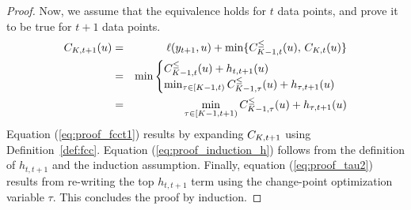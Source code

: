 \documentclass{article}
\begin{document}
\begin{proof}
  Now, we
  assume that the equivalence holds for $t$ data points, and prove it to be true
  for $t+1$ data points.
  \begin{eqnarray}
    C_{K,t+1}(u)\label{eq:proof_fcct1}
    &=&\ell(y_{t+1},u)+\min\{C_{K-1,t}^\leq(u),\,C_{K,t}(u)\}\\
    &=&\min\label{eq:proof_induction_h}
        \begin{cases}
          C_{K-1,t}^\leq(u)+h_{t,t+1}(u)\\
          \min_{\tau\in[K-1,t)} C^\leq_{K-1,\tau}(u)+h_{\tau,t+1}(u)
        \end{cases}\\
    &=&\min_{\tau\in[K-1,t+1)} C^\leq_{K-1,\tau}(u)+h_{\tau,t+1}(u)
        \label{eq:proof_tau2}
  \end{eqnarray}
  Equation (\ref{eq:proof_fcct1}) results by expanding $C_{K,t+1}$
  using Definition~\ref{def:fcc}. Equation
  (\ref{eq:proof_induction_h}) follows from the definition of
  $h_{t,t+1}$ and the induction assumption. Finally, equation
  (\ref{eq:proof_tau2}) results from re-writing the top $h_{t,t+1}$ term using the
  change-point optimization variable $\tau$.  This concludes the proof
  by induction.
\end{proof}
\end{document}
